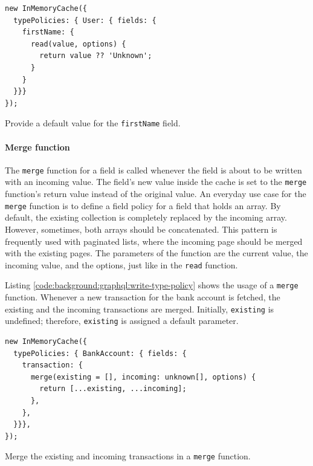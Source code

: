 \ifshowListings
\begin{listing}[H]
    \begin{verbatim}
new InMemoryCache({
  typePolicies: { User: { fields: {
    firstName: {
      read(value, options) {
        return value ?? 'Unknown';
      }
    }
  }}}
});
    \end{verbatim}
    \caption{Provide a default value for the \texttt{firstName} field.}\label{code:background:graphql:read-type-policy}
\end{listing}
\fi

\paragraph{Merge function}

The \texttt{merge} function for a field is called whenever the field is about to be written with an incoming value. The field's new value inside the cache is set to the \texttt{merge} function's return value instead of the original value. An everyday use case for the \texttt{merge} function is to define a field policy for a field that holds an array. By default, the existing collection is completely replaced by the incoming array. However, sometimes, both arrays should be concatenated. This pattern is frequently used with paginated lists, where the incoming page should be merged with the existing pages. The parameters of the function are the current value, the incoming value, and the options, just like in the \texttt{read} function. \cite{misc:-:background:graphql:apollo-client-cache-reading-writing}

\bigskip

\noindent Listing \ref{code:background:graphql:write-type-policy} shows the usage of a \texttt{merge} function. Whenever a new transaction for the bank account is fetched, the existing and the incoming transactions are merged. Initially, \texttt{existing} is undefined; therefore, \texttt{existing} is assigned a default parameter.

\ifshowListings
\begin{listing}[H]
    \begin{verbatim}
new InMemoryCache({
  typePolicies: { BankAccount: { fields: {
    transaction: {
      merge(existing = [], incoming: unknown[], options) {
        return [...existing, ...incoming];
      },
    },
  }}},
});
    \end{verbatim}
    \caption{Merge the existing and incoming transactions in a \texttt{merge} function.}\label{code:background:graphql:write-type-policy}
\end{listing}
\fi
